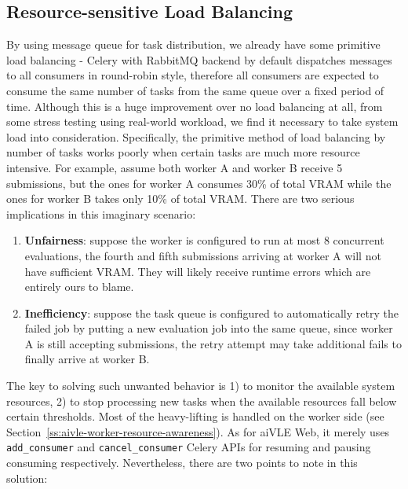 \subsection{Resource-sensitive Load Balancing}
\label{ss:aivle-web-load-balancing}
By using message queue for task distribution, we already have some primitive load balancing - Celery with RabbitMQ backend by default dispatches messages to all consumers in round-robin style, therefore all consumers are expected to consume the same number of tasks from the same queue over a fixed period of time. Although this is a huge improvement over no load balancing at all, from some stress testing using real-world workload, we find it necessary to take system load into consideration. Specifically, the primitive method of load balancing by number of tasks works poorly when certain tasks are much more resource intensive. For example, assume both worker A and worker B receive 5 submissions, but the ones for worker A consumes 30\% of total VRAM while the ones for worker B takes only 10\% of total VRAM. There are two serious implications in this imaginary scenario:
\begin{enumerate}
    \item \textbf{Unfairness}: suppose the worker is configured to run at most 8 concurrent evaluations, the fourth and fifth submissions arriving at worker A will not have sufficient VRAM. They will likely receive runtime errors which are entirely ours to blame.
    \item \textbf{Inefficiency}: suppose the task queue is configured to automatically retry the failed job by putting a new evaluation job into the same queue, since worker A is still accepting submissions, the retry attempt may take additional fails to finally arrive at worker B.
\end{enumerate}

The key to solving such unwanted behavior is 1) to monitor the available system resources, 2) to stop processing new tasks when the available resources fall below certain thresholds. Most of the heavy-lifting is handled on the worker side (see Section~\ref{ss:aivle-worker-resource-awareness}). As for aiVLE Web, it merely uses \texttt{add\_consumer} and \texttt{cancel\_consumer} Celery APIs for resuming and pausing consuming respectively. Nevertheless, there are two points to note in this solution:

